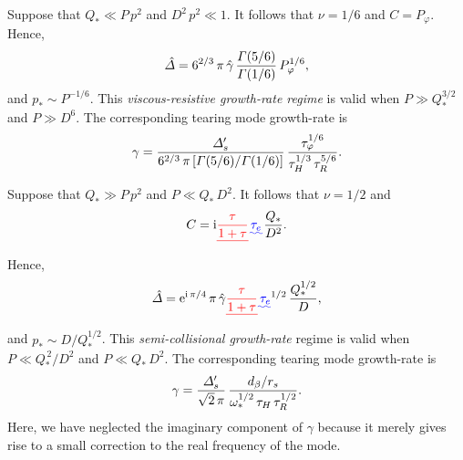 \documentclass[12pt,prb,aps]{revtex4-1}
\providecommand{\DIFadd}[1]{{\protect\color{blue}\uwave{#1}}} %
\providecommand{\DIFdel}[1]{{\protect\color{red}\sout{#1}}}                      %
\providecommand{\DIFaddbegin}{} %
\providecommand{\DIFaddend}{} %
\providecommand{\DIFdelbegin}{} %
\providecommand{\DIFdelend}{} %
\begin{document}
Suppose that $Q_\ast \ll P\,p^2$ and $D^2\,p^2\ll 1$. 
It follows that $\nu=1/6$ and
$C = P_\varphi$. 
Hence, 
\begin{equation}
\hat{\mit\Delta} = 6^{2/3}\,\pi\,\hat{\gamma}\, \frac{{\mit\Gamma}(5/6)}{{\mit\Gamma}(1/6)}\,P_\varphi^{1/6}, 
\end{equation}
and $p_\ast\sim P^{-1/6}$. This  {\em viscous-resistive growth-rate regime}\/ is valid when $P\gg Q_\ast^{3/2}$ and
$P\gg D^6$. 
The corresponding tearing mode growth-rate is
\begin{equation}\label{e365}
\gamma = \frac{{\mit\Delta}_s'}{6^{2/3}\,\pi\,[{\mit\Gamma}(5/6)/{\mit\Gamma}(1/6)]}\,\frac{\tau_\varphi^{1/6}}{\tau_H^{1/3}\,\tau_R^{5/6}}.
\end{equation}

Suppose that $Q_\ast\gg P\,p^2$ and $P\ll Q_\ast\,D^2$. It follows that $\nu=1/2$ and
\begin{equation}
C = {\rm i}\DIFdelbegin %
\DIFdel{\frac{\tau}{1+\tau}}%
\DIFdelend \DIFaddbegin \DIFadd{\,\tau_e\,}\DIFaddend \frac{Q_\ast}{D^2}.
\end{equation} 
Hence, 
\begin{equation}
\hat{\mit\Delta} = {\rm e}^{{\rm i}\,\pi/4}\,\pi\,\hat{\gamma}\DIFdelbegin %
\DIFdel{\frac{\tau}{1+\tau}}%
\DIFdelend \DIFaddbegin \DIFadd{\,\tau_e}\DIFaddend ^{1/2}\,\frac{Q_\ast^{1/2}}{D},
\end{equation}
and $p_\ast\sim D/Q_\ast^{1/2}$. This  {\em semi-collisional growth-rate}\/ regime is valid when $P\ll Q_\ast^{\,2}/D^2$ and
$P\ll Q_\ast\,D^2$. 
The corresponding tearing mode growth-rate is
\begin{equation}\label{e368}
\gamma = \frac{{\mit\Delta}_s'}{\sqrt{2}\,\pi}\,\frac{d_\beta/r_s}{\omega_\ast^{1/2}\,\tau_H\,\tau_R^{1/2}}.
\end{equation}
Here, we have neglected the imaginary component of $\gamma$ because it merely gives rise to a small correction to the
real frequency of the mode. 
\end{document}

